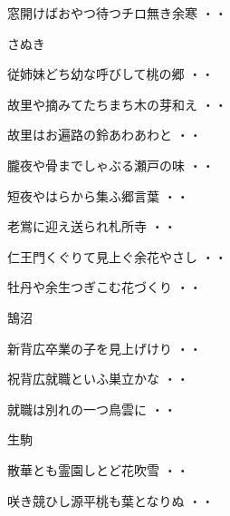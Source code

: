 \begin{shiika}窓開けばおやつ待つチロ無き余寒
\hfill{・・}\end{shiika}
\vspace{0.4cm}
さぬき
\begin{shiika}従姉妹どち幼な呼びして桃の郷
\hfill{・・}\end{shiika}
\begin{shiika}故里や摘みてたちまち木の芽和え
\hfill{・・}\end{shiika}
\begin{shiika}故里はお遍路の鈴あわあわと
\hfill{・・}\end{shiika}
\begin{shiika}朧夜や骨までしゃぶる瀬戸の味
\hfill{・・}\end{shiika}
\begin{shiika}短夜やはらから集ふ郷言葉
\hfill{・・}\end{shiika}
\begin{shiika}老鴬に迎え送られ札所寺
\hfill{・・}\end{shiika}
\begin{shiika}仁王門くぐりて見上ぐ余花やさし
\hfill{・・}\end{shiika}
\begin{shiika}牡丹や余生つぎこむ花づくり
\hfill{・・}\end{shiika}
\vspace{0.4cm}
鵠沼
\begin{shiika}新背広卒業の子を見上げけり
\hfill{・・}\end{shiika}
\begin{shiika}祝背広就職といふ巣立かな
\hfill{・・}\end{shiika}
\begin{shiika}就職は別れの一つ鳥雲に
\hfill{・・}\end{shiika}
\vspace{0.4cm}
生駒
\begin{shiika}散華とも霊園しとど花吹雪
\hfill{・・}\end{shiika}
\begin{shiika}咲き競ひし源平桃も葉となりぬ
\hfill{・・}\end{shiika}
